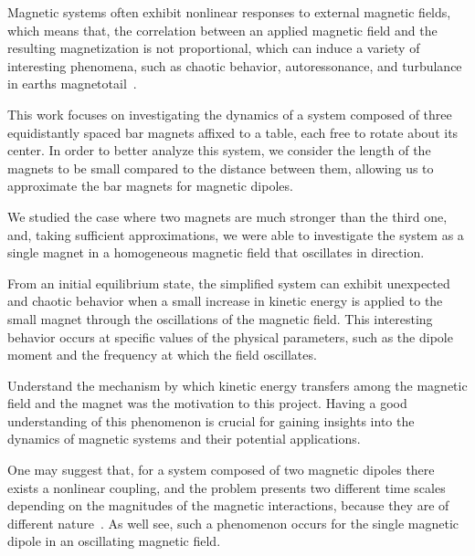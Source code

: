Magnetic systems often exhibit nonlinear responses to external magnetic fields, which means that, the correlation between an applied magnetic field and the resulting magnetization is not proportional, which can induce a variety of interesting phenomena, such as chaotic behavior, autoressonance, and turbulance in earth\textquotesingle s magnetotail~\cite{nonlinearResponse,Bratman1983,Loeb1986,VerandaM,Brunton2017,Chang1999}. 


This work focuses on investigating the dynamics of a system composed of three equidistantly spaced bar magnets affixed to a table, each free to rotate about its center. In order to better analyze this system, we consider the length of the magnets to be small compared to the distance between them, allowing us to approximate the bar magnets for magnetic dipoles.

We studied the case where two magnets are much stronger than the third one, and, taking sufficient approximations, we were able to investigate the system as a single magnet in a homogeneous magnetic field that oscillates in direction.

From an initial equilibrium state, the simplified system can exhibit unexpected and chaotic behavior when a small increase in kinetic energy is applied to the small magnet through the oscillations of the magnetic field. This interesting behavior occurs at specific values of the physical parameters, such as the dipole moment and the frequency at which the field oscillates.

Understand the mechanism by which kinetic energy transfers among the magnetic field and the magnet was the motivation to this project. Having a good understanding of this phenomenon is crucial for gaining insights into the dynamics of magnetic systems and their potential applications.

One may suggest that, for a system composed of two magnetic dipoles there exists a nonlinear coupling, and the problem presents two different time scales depending on the magnitudes of the magnetic interactions, because they are of different nature~\cite{LAROZE20081440}. As we\textquotesingle ll see, such a phenomenon occurs for the single magnetic dipole in an oscillating magnetic field. 

